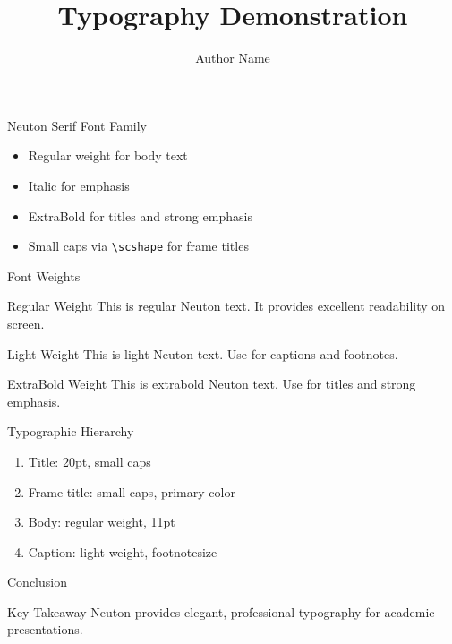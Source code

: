 \documentclass[10pt]{beamer}
\title[]{Typography Demonstration}
\author[]{Author Name}
\institute[]{Institution Name}
\date{}
\begin{document}
\begin{frame}
  \titlepage
\end{frame}

\begin{frame}{Neuton Serif Font Family}
  \begin{itemize}
    \item Regular weight for body text
    \item Italic for emphasis
    \item ExtraBold for titles and strong emphasis
    \item Small caps via \texttt{\textbackslash scshape} for frame titles
  \end{itemize}
\end{frame}

\begin{frame}{Font Weights}
  \begin{block}{Regular Weight}
    This is regular Neuton text. It provides excellent readability on screen.
  \end{block}
  
  \begin{exampleblock}{Light Weight}
    This is light Neuton text. Use for captions and footnotes.
  \end{exampleblock}
  
  \begin{alertblock}{ExtraBold Weight}
    This is extrabold Neuton text. Use for titles and strong emphasis.
  \end{alertblock}
\end{frame}

\begin{frame}{Typographic Hierarchy}
  \begin{enumerate}
    \item Title: 20pt, small caps
    \item Frame title: small caps, primary color
    \item Body: regular weight, 11pt
    \item Caption: light weight, footnotesize
  \end{enumerate}
\end{frame}

\begin{frame}{Conclusion}
  \begin{block}{Key Takeaway}
    Neuton provides elegant, professional typography for academic presentations.
  \end{block}
\end{frame}
\end{document}
